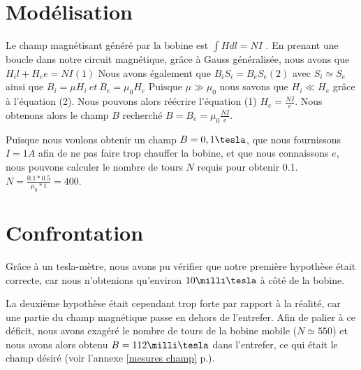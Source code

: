 \section{Modélisation}
Le champ magnétisant généré par la bobine est $\int{H dl} = N I$ .
En prenant une boucle dans notre circuit magnétique, grâce à Gauss généralisée, nous avons que
$H_i l + H_e e = N I (1)$
Nous avons également que $B_i S_i = B_e S_e (2)$  avec $S_i \simeq S_e$
ainsi que $B_i = \mu H_i \:et\:  B_e = \mu_0 H_e$
Puisque $\mu \gg \mu_0$ nous savons que $H_i \ll H_e$ grâce à l'équation (2).
Nous pouvons alors réécrire l'équation (1) $H_e = \frac{N I}{e}$.
Nous obtenons alors le champ $B$ recherché $B = B_e = \mu_0 \frac{N I}{e}$.

Puisque nous voulons obtenir un champ $B = 0,1 \tesla$, que nous fournissons $I = 1 A$ afin de ne pas faire trop 
chauffer la bobine, et que nous connaissons $e$, nous pouvons calculer le nombre de tours $N$ requis pour obtenir 0.1\tesla.
$N = \frac{0.1 * 0.5}{\mu_0 * 1} = 400$.

\section{Confrontation}
Grâce à un tesla-mètre, nous avons pu vérifier que notre première hypothèse était correcte, car nous n'obtenions 
qu'environ $10 \milli\tesla$ à côté de la bobine. 

La deuxième hypothèse était cependant trop forte par rapport à la réalité, car une 
partie du champ magnétique passe en dehors de l'entrefer. Afin de palier à ce déficit, nous avons exagéré le nombre de 
tours de la bobine mobile ($N \simeq 550$) et nous avons alors obtenu $B = 112 \milli\tesla$ dans l'entrefer, 
ce qui était le champ désiré (voir l'annexe \ref{mesures champ} p.\pageref{mesures champ}).